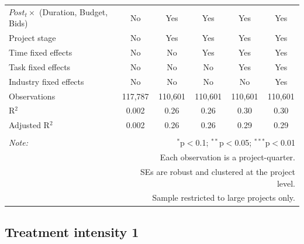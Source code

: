 \documentclass[
]{article}
\begin{document}
\begin{table}[H]
\begin{tabular}{@{\extracolsep{-10pt}}lccccc}
$Post_t \times $  (Duration, Budget, Bids) & No & Yes & Yes & Yes & Yes \\ 
Project stage & No & Yes & Yes & Yes & Yes \\ 
Time fixed effects & No & No & Yes & Yes & Yes \\ 
Task fixed effects & No & No & No & Yes & Yes \\ 
Industry fixed effects & No & No & No & No & Yes \\ 
Observations & 117,787 & 110,601 & 110,601 & 110,601 & 110,601 \\ 
R$^{2}$ & 0.002 & 0.26 & 0.26 & 0.30 & 0.30 \\ 
Adjusted R$^{2}$ & 0.002 & 0.26 & 0.26 & 0.29 & 0.29 \\ 
\hline 
\hline \\[-1.8ex] 
\textit{Note:}  & \multicolumn{5}{r}{$^{*}$p$<$0.1; $^{**}$p$<$0.05; $^{***}$p$<$0.01} \\ 
 & \multicolumn{5}{r}{Each observation is a project-quarter.} \\ 
 & \multicolumn{5}{r}{SEs are robust and clustered at the project level.} \\ 
 & \multicolumn{5}{r}{Sample restricted to large projects only.} \\ 
\end{tabular} 
\end{table}

\hypertarget{treatment-intensity-1}{%
\subsection{Treatment intensity 1}\label{treatment-intensity-1}}
\end{document}
